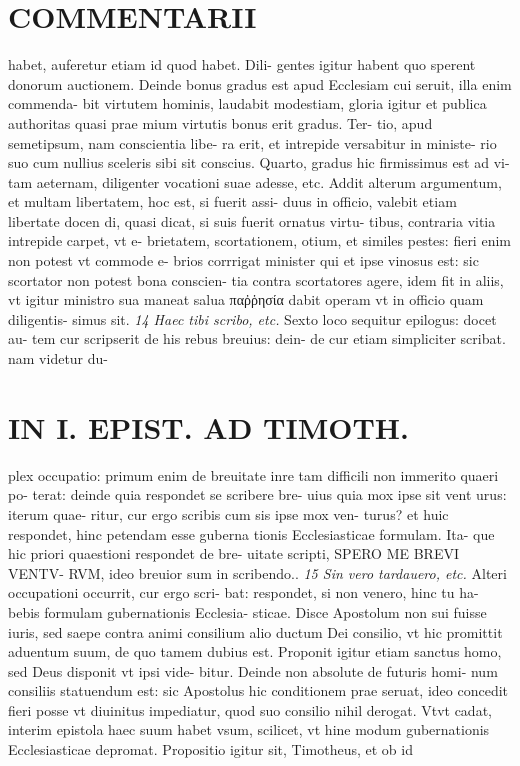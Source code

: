\documentclass{article}
\begin{document}
\begin{pages}
\section*{COMMENTARII }
\marginpar{[ p.76 ]}\pstart habet, auferetur etiam id quod habet. Dili- gentes igitur habent quo sperent donorum auctionem. Deinde bonus gradus est apud Ecclesiam cui seruit, illa enim commenda- bit virtutem hominis, laudabit modestiam, gloria igitur et publica authoritas quasi prae mium virtutis bonus erit gradus. Ter- tio, apud semetipsum, nam conscientia libe- ra erit, et intrepide versabitur in ministe- rio suo cum nullius sceleris sibi sit conscius. Quarto, gradus hic firmissimus est ad vi- tam aeternam, diligenter vocationi suae adesse, etc. Addit alterum argumentum, et multam libertatem, hoc est, si fuerit assi- duus in officio, valebit etiam libertate docen di, quasi dicat, si suis fuerit ornatus virtu- tibus, contraria vitia intrepide carpet, vt e- brietatem, scortationem, otium, et similes pestes: fieri enim non potest vt commode e- brios corrrigat minister qui et ipse vinosus est: sic scortator non potest bona conscien- tia contra scortatores agere, idem fit in aliis, vt igitur ministro sua maneat salua παῤῥησία dabit operam vt in officio quam diligentis- simus sit.  \pend
\textit{14 Haec tibi scribo, etc. }\pstart Sexto loco sequitur epilogus: docet au- tem cur scripserit de his rebus breuius: dein- de cur etiam simpliciter scribat. nam videtur du-  \pend
\section*{IN I. EPIST. AD TIMOTH. }
\marginpar{[ p.77 ]}\pstart plex occupatio: primum enim de breuitate inre tam difficili non immerito quaeri po- terat: deinde quia respondet se scribere bre- uius quia mox ipse sit vent urus: iterum quae- ritur, cur ergo scribis cum sis ipse mox ven- turus? et huic respondet, hinc petendam esse guberna tionis Ecclesiasticae formulam. Ita- que hic priori quaestioni respondet de bre- uitate scripti, SPERO ME BREVI VENTV- RVM, ideo breuior sum in scribendo..  \pend
\textit{15 Sin vero tardauero, etc. }\pstart Alteri occupationi occurrit, cur ergo scri- bat: respondet, si non venero, hinc tu ha- bebis formulam gubernationis Ecclesia- sticae.  \pend\pstart Disce Apostolum non sui fuisse iuris, sed saepe contra animi consilium alio ductum Dei consilio, vt hic promittit aduentum suum, de quo tamem dubius est. Proponit igitur etiam sanctus homo, sed Deus disponit vt ipsi vide- bitur. Deinde non absolute de futuris homi- num consiliis statuendum est: sic Apostolus hic conditionem prae seruat, ideo concedit fieri posse vt diuinitus impediatur, quod suo consilio nihil derogat. Vtvt cadat, interim epistola haec suum habet vsum, scilicet, vt hine modum gubernationis Ecclesiasticae depromat.  \pend\pstart Propositio igitur sit, Timotheus, et ob id  \pend

\end{pages}
\end{document}
